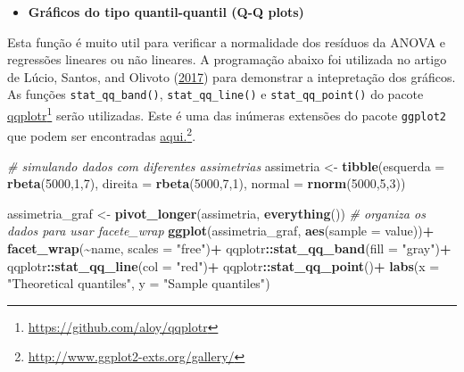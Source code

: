 \documentclass[
]{book}
\newenvironment{Shaded}{\begin{snugshade}}{\end{snugshade}}
\newcommand{\CommentTok}[1]{\textcolor[rgb]{0.56,0.35,0.01}{\textit{#1}}}
\newcommand{\DataTypeTok}[1]{\textcolor[rgb]{0.13,0.29,0.53}{#1}}
\newcommand{\DecValTok}[1]{\textcolor[rgb]{0.00,0.00,0.81}{#1}}
\newcommand{\KeywordTok}[1]{\textcolor[rgb]{0.13,0.29,0.53}{\textbf{#1}}}
\newcommand{\NormalTok}[1]{#1}
\newcommand{\OperatorTok}[1]{\textcolor[rgb]{0.81,0.36,0.00}{\textbf{#1}}}
\newcommand{\StringTok}[1]{\textcolor[rgb]{0.31,0.60,0.02}{#1}}
\providecommand{\tightlist}{%
  \setlength{\itemsep}{0pt}\setlength{\parskip}{0pt}}
\numberwithin{equation}{section}
\begin{document}
\begin{itemize}
\tightlist
\item
  \textbf{Gráficos do tipo quantil-quantil (Q-Q plots)}
\end{itemize}

Esta função é muito util para verificar a normalidade dos resíduos da ANOVA e regressões lineares ou não lineares. A programação abaixo foi utilizada no artigo de Lúcio, Santos, and Olivoto (\protect\hyperlink{ref-Lucio2017}{2017}) para demonstrar a intepretação dos gráficos. As funções \texttt{stat\_qq\_band()}, \texttt{stat\_qq\_line()} e \texttt{stat\_qq\_point()} do pacote \href{https://github.com/aloy/qqplotr}{qqplotr}\footnote{\url{https://github.com/aloy/qqplotr}} serão utilizadas. Este é uma das inúmeras extensões do pacote \texttt{ggplot2} que podem ser encontradas \href{http://www.ggplot2-exts.org/gallery/}{aqui.}\footnote{\url{http://www.ggplot2-exts.org/gallery/}}.

\begin{Shaded}
\begin{Highlighting}[]
\CommentTok{\# simulando dados com diferentes assimetrias}
\NormalTok{assimetria \textless{}{-}}\StringTok{ }\KeywordTok{tibble}\NormalTok{(}\DataTypeTok{esquerda =} \KeywordTok{rbeta}\NormalTok{(}\DecValTok{5000}\NormalTok{,}\DecValTok{1}\NormalTok{,}\DecValTok{7}\NormalTok{),}
                     \DataTypeTok{direita =} \KeywordTok{rbeta}\NormalTok{(}\DecValTok{5000}\NormalTok{,}\DecValTok{7}\NormalTok{,}\DecValTok{1}\NormalTok{),}
                     \DataTypeTok{normal =} \KeywordTok{rnorm}\NormalTok{(}\DecValTok{5000}\NormalTok{,}\DecValTok{5}\NormalTok{,}\DecValTok{3}\NormalTok{))}

\NormalTok{assimetria\_graf \textless{}{-}}\StringTok{ }\KeywordTok{pivot\_longer}\NormalTok{(assimetria, }\KeywordTok{everything}\NormalTok{()) }\CommentTok{\# organiza os dados para usar facete\_wrap}
\KeywordTok{ggplot}\NormalTok{(assimetria\_graf, }\KeywordTok{aes}\NormalTok{(}\DataTypeTok{sample =}\NormalTok{ value))}\OperatorTok{+}
\StringTok{       }\KeywordTok{facet\_wrap}\NormalTok{(}\OperatorTok{\textasciitilde{}}\NormalTok{name, }\DataTypeTok{scales =} \StringTok{"free"}\NormalTok{)}\OperatorTok{+}
\StringTok{       }\NormalTok{qqplotr}\OperatorTok{::}\KeywordTok{stat\_qq\_band}\NormalTok{(}\DataTypeTok{fill =} \StringTok{"gray"}\NormalTok{)}\OperatorTok{+}
\StringTok{       }\NormalTok{qqplotr}\OperatorTok{::}\KeywordTok{stat\_qq\_line}\NormalTok{(}\DataTypeTok{col =} \StringTok{"red"}\NormalTok{)}\OperatorTok{+}
\StringTok{       }\NormalTok{qqplotr}\OperatorTok{::}\KeywordTok{stat\_qq\_point}\NormalTok{()}\OperatorTok{+}
\KeywordTok{labs}\NormalTok{(}\DataTypeTok{x =} \StringTok{"Theoretical quantiles"}\NormalTok{, }\DataTypeTok{y =} \StringTok{"Sample quantiles"}\NormalTok{)}
\end{Highlighting}
\end{Shaded}
\end{document}
